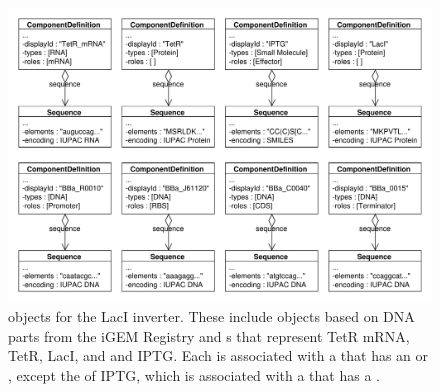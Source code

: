 \begin{figure}[ht]
\begin{center}
\includegraphics[width=\textwidth]{example_uml/toggle_1}
\caption[]{ objects for the LacI inverter. These include  objects based on DNA parts from the iGEM Registry and  s that represent TetR mRNA, TetR, LacI, and and IPTG. Each  is associated with a  that has an  or  , except the  of IPTG, which is associated with a  that has a  .}
\label{uml:ex_comp_defs}
\end{center}
\end{figure}

